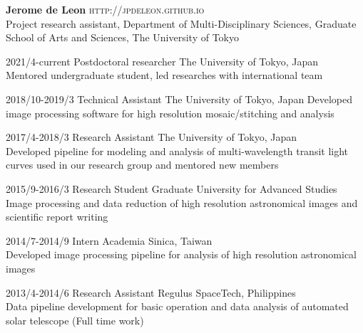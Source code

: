 \documentclass[12pt,letterpaper]{article}
\begin{document}
\thispagestyle{empty}\sloppy\sloppypar\raggedbottom

\textbf{\Large Jerome de Leon} \hfill
\textsc{\small http://jpdeleon.github.io} \\[0.5ex]
Project research assistant, Department of Multi-Disciplinary Sciences, Graduate School of Arts and Sciences, The University of Tokyo\\[0.5ex]

\begin{list}{}{\cvlist}
\item 2021/4-current	Postdoctoral researcher	The University of Tokyo, Japan\\
Mentored undergraduate student, led researches with international team\\
\item 2018/10-2019/3	Technical Assistant		The University of Tokyo, Japan
Developed image processing software for high resolution mosaic/stitching and analysis\\
\item 2017/4-2018/3 	Research Assistant		The University of Tokyo, Japan\\
Developed pipeline for modeling and analysis of multi-wavelength transit light curves used in our research group and mentored new members\\ 
\item 2015/9-2016/3 	Research Student		Graduate University for Advanced Studies\\
Image processing and data reduction of high resolution astronomical images and scientific report writing\\
\item 2014/7-2014/9		Intern				Academia Sinica, Taiwan\\
Developed image processing pipeline for analysis of high resolution astronomical images\\
\item 2013/4-2014/6  	Research Assistant 	Regulus SpaceTech, Philippines\\
Data pipeline development for basic operation and data analysis of automated solar telescope (Full time work)\\

\end{list}

\begin{list}{}{\cvlist}

\end{list}
\end{document}
